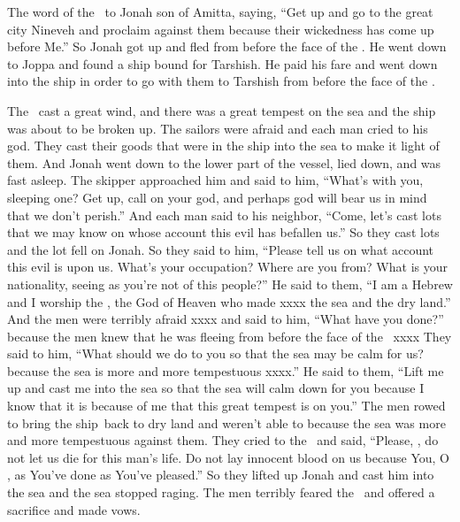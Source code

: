 
\begin{inparaenum}
   The word of the \lord\ to Jonah son of Amitta, saying,%
   ``Get up and go to the great city Nineveh and proclaim against them because their wickedness has come up before Me.''%
   So Jonah got up  and fled from before the face of the \lord. He went down to Joppa and found a ship bound for Tarshish. He paid his fare and went down into the ship in order to go with them to Tarshish from before the face of the \lord.%
  
   The \lord\ cast a great wind, and there was a great tempest on the sea and the ship was about to be broken up.%
   The sailors were afraid and each man cried to his god. They cast their goods that were in the ship into the sea to make it light of them. And Jonah went down to the lower part of the vessel, lied down, and was fast asleep.%
   The skipper approached him and said to him, ``What's with you, sleeping one? Get up, call on your god, and perhaps god will bear us in mind that we don't perish.''%
   And each man said to his neighbor, ``Come, let's cast lots that we may know on whose account this evil has befallen us.'' So they cast lots and the lot fell on Jonah.%
   So they said to him, ``Please tell us on what account this evil is upon us. What's your occupation? Where are you from? What is your nationality, seeing as you're not of this people?''%
   He said to them, ``I am a Hebrew and I worship the \lord, the God of Heaven who made xxxx the sea and the dry land.''%
   And the men were terribly afraid xxxx and said to him, ``What have you done?'' because the men knew that he was fleeing from before the face of the \lord\ xxxx%
   They said to him, ``What should we do to you so that the sea may be calm for us? because the sea is more and more tempestuous xxxx.''%
   He said to them, ``Lift me up and cast me into the sea so that the sea will calm down for you because I know that it is because of me that this great tempest is on you.''%
   The men rowed to bring the ship\understood\ back to dry land and weren't able to because the sea was more and more tempestuous against them.%
   They cried to the \lord\ and said, ``Please, \lord, do not let us die for this man's life. Do not lay innocent blood on us because You, O \lord, as You've done as You've pleased.''%
   So they lifted up Jonah and cast him into the sea and the sea stopped raging.%
   The men terribly feared the \lord\ and offered a sacrifice and made vows.%
\end{inparaenum}
